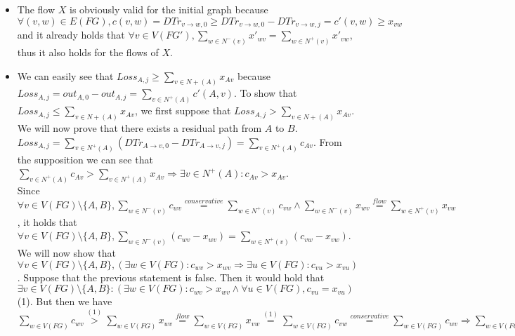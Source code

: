           \begin{itemize}
             \item The flow $X$ is obviously valid for the initial graph because $\forall (v,w) \in E(FG), c(v,w) = DTr_{v
             \rightarrow w, 0} \geq DTr_{v \rightarrow w, 0} - DTr_{v \rightarrow w, j} = c'(v,w) \geq x_{vw}$ and it
             already holds that $\forall v \in V(FG'), \sum\limits_{w \in N^{-}(v)}x'_{wv} = \sum\limits_{w \in N^{+}(v)}
             x'_{vw}$, thus it also holds for the flows of $X$.
             \item We can easily see that $Loss_{A,j} \geq \sum\limits_{v \in N{+}(A)}x_{Av}$ because $Loss_{A,j} =
             out_{A,0} - out_{A,j} = \sum\limits_{v \in N^{+}(A)}c'(A,v)$. To show that $Loss_{A,j} \leq
             \sum\limits_{v \in N{+}(A)}x_{Av}$, we first suppose that $Loss_{A,j} > \sum\limits_{v \in N{+}(A)}x_{Av}$. We
             will now prove that there exists a residual path from $A$ to $B$. $Loss_{A,j} = \sum\limits_{v \in N^{+}(A)}
             (DTr_{A \rightarrow v, 0} - DTr_{A \rightarrow v, j}) = \sum\limits_{v \in N^{+}(A)}c_{Av}$. From the
             supposition we can see that $\sum\limits_{v \in N^{+}(A)}c_{Av} > \sum\limits_{v \in N^{+}(A)}x_{Av}
             \Rightarrow \exists v \in N^{+}(A) : c_{Av} > x_{Av}$. \\
             Since $\forall v \in V(FG) \setminus \{A,B\}, \sum\limits_{w \in N^{-}(v)}c_{wv} \overset{conservative}{=}
             \sum\limits_{w \in N^{+}(v)}c_{vw} \wedge \sum\limits_{w \in N^{-}(v)}x_{wv} \overset{flow}{=}
             \sum\limits_{w \in N^{+}(v)}x_{vw}$, it holds that $\forall v \in V(FG) \setminus \{A,B\}, \sum\limits_{w \in
             N^{-}(v)}(c_{wv} - x_{wv}) = \sum\limits_{w \in N^{+}(v)}(c_{vw} - x_{vw})$. \\
             We will now show that $\forall v \in V(FG) \setminus
             \{A,B\}, (\exists w \in V(FG) : c_{wv} > x_{wv} \Rightarrow \exists u \in V(FG) : c_{vu} > x_{vu})$. Suppose
             that the previous statement is false. Then it would hold that $\exists v \in V(FG) \setminus \{A,B\} :
             (\exists w \in V(FG) : c_{wv} > x_{wv} \wedge \forall u \in V(FG), c_{vu} = x_{vu})$ (1). But then we have
             $\sum\limits_{w \in V(FG)}c_{wv} \overset{(1)}{>} \sum\limits_{w \in V(FG)}x_{wv} \overset{flow}{=}
             \sum\limits_{w \in V(FG)}x_{vw} \overset{(1)}{=} \sum\limits_{w \in V(FG)}c_{vw} \overset{conservative}{=}
             \sum\limits_{w \in V(FG)}c_{wv} \Rightarrow \sum\limits_{w \in V(FG)}c_{wv} > \sum\limits_{w \in V(FG)}c_{wv}$

\end{itemize}
